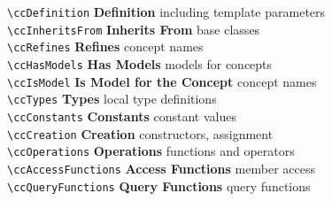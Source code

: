 \begin{tabbing}
  \> \verb+\ccDefinition+      \>  {\bf Definition}    \>
                                          including template parameters\\ %
  \> \verb+\ccInheritsFrom+    \>  {\bf Inherits From}     \>
                                                     base classes\\ %
  \> \verb+\ccRefines+         \>  {\bf Refines}     \>
                                                     concept names\\
  \> \verb+\ccHasModels+       \>  {\bf Has Models}     \>
                                                     models for concepts\\
  \> \verb+\ccIsModel+         \>  {\bf Is Model for the Concept}     \>
                                                     concept names\\
  \> \verb+\ccTypes+           \>  {\bf Types}         \>
                                                     local type definitions\\ %
  \> \verb+\ccConstants+       \>  {\bf Constants}     \>
                                                     constant values\\ %
  \> \verb+\ccCreation+        \>  {\bf Creation}      \>
                                                     constructors, assignment\\ %
  \> \verb+\ccOperations+      \>  {\bf Operations}    \>
                                                     functions and operators\\ %
  \> \verb+\ccAccessFunctions+ \>  {\bf Access Functions}    \>
                                                     member access\\ %
  \> \verb+\ccQueryFunctions+ \>   {\bf Query Functions}    \>
                                                     query functions\\

\end{tabbing}
